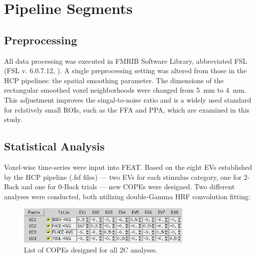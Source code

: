 \section{Pipeline Segments}

\subsection{Preprocessing}

All data processing was executed in FMRIB Software Library, abbreviated FSL (FSL v. 6.0.7.12, \cite{Jenkinson2012}). A single preprocessing setting was altered from those in the \gls{HCP} pipelines: the spatial smoothing parameter. The dimensions of the rectangular smoothed voxel neighborhoods were changed from \SI{5}{\milli\meter} to \SI{4}{\milli\meter}. This adjustment improves the singal-to-noise ratio and is a widely used standard for relatively small \gls{ROI}s, such as the \gls{FFA} and \gls{PPA}, which are examined in this study.

\subsection{Statistical Analysis}
\label{subs:stat}

Voxel-wise time-series were input into \gls{FEAT}. Based on the eight \gls{EV}s established by the \gls{HCP} pipeline (.fsf files) --- two \gls{EV}s for each stimulus category, one for 2-Back and one for 0-Back trials --- new \gls{COPE}s were designed. Two different analyses were conducted, both utilizing double-Gamma \gls{HRF} convolution fitting: 

\begin{figure}[htbp]
    \centering
    \includegraphics[width = 0.75\textwidth]{assets/images/COPEs_2C.png}
    \caption[]{List of \gls{COPE}s designed for all \gls{2C} analyses.}
    \label{fig:copes_2C}
\end{figure}

\addtocounter{table}{1}
\addtocounter{figure}{-1}

